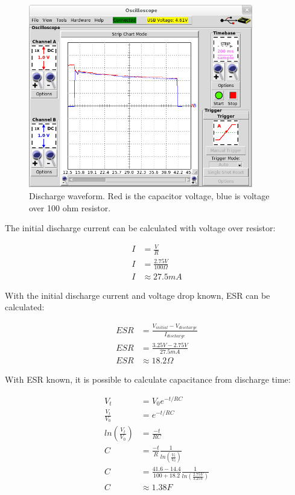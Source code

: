 \begin{figure}[htb]
\begin{center}
\includegraphics[height=8cm]{images/own_measurement/circuit/discharge.png}
\end{center}
\caption{\label{fig:scap_discharge} Discharge waveform. Red is the capacitor voltage, blue is voltage over 100 ohm resistor.}
\end{figure}

The initial discharge current can be calculated with voltage over resistor:

\begin{equation}
\begin{split}
  I &= \frac{V}{R} \\
  I &= \frac{2.75 V}{100 \Omega} \\
  I &\approx 27.5 mA 
\end{split}
\end{equation}

With the initial discharge current and voltage drop known, ESR can be calculated:

\begin{equation}
\begin{split}
  ESR &= \frac{V_{initial} - V_{discharge}}{I_{discharge}} \\
  ESR &= \frac{3.25 V - 2.75 V}{27.5 mA} \\
  ESR &\approx 18.2 \Omega
\end{split}
\end{equation}

With ESR known, it is possible to calculate capacitance from discharge time:

\begin{equation}
\begin{split}
  V_t                 &= V_{0}e^{-t/RC} \\
  \frac{V_t}{V_0}     &= e^{-t/RC} \\
  ln(\frac{V_t}{V_0}) &= \frac{-t}{RC} \\
  C                   &= \frac{-t}{R} \frac{1}{ ln(\frac{V_t}{V_0})} \\
  C                   &= \frac{41.6-14.4}{100 + 18.2} \frac{1}{ ln(\frac{2.75 V}{3.25 V})} \\
  C                   &\approx 1.38 F
\end{split}
\end{equation}

